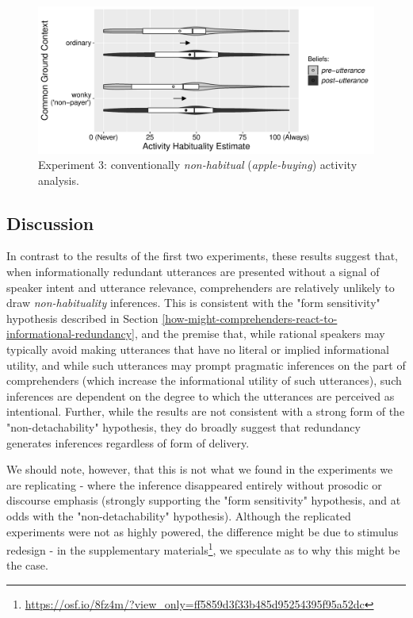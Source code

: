 \documentclass{sp}\usepackage[]{graphicx}\usepackage[]{color}
\makeatletter
\def\maxwidth{ %
  \ifdim\Gin@nat@width>\linewidth
    \linewidth
  \else
    \Gin@nat@width
  \fi
}
\newenvironment{knitrout}{}{} %
\makeatother
\begin{document}
\begin{knitrout}
\color{fgcolor}\begin{figure}
\includegraphics[width=\maxwidth]{figure/unnamed-chunk-61-1} \caption{\label{fig:exp3nonhabitual}Experiment 3: conventionally \textit{non-habitual} (\textit{apple-buying}) activity analysis.}\label{fig:unnamed-chunk-61}
\end{figure}


\end{knitrout}

\subsection{Discussion}

In contrast to the results of the first two experiments, these results suggest that, when informationally redundant utterances are presented without a signal of speaker intent and utterance relevance, comprehenders are relatively unlikely to draw \textit{non-habituality} inferences. This is consistent with the "form sensitivity" hypothesis described in Section \ref{how-might-comprehenders-react-to-informational-redundancy}, and the premise that, while rational speakers may typically avoid making utterances that have no literal or implied informational utility, and while such utterances may prompt pragmatic inferences on the part of comprehenders (which increase the informational utility of such utterances), such inferences are dependent on the degree to which the utterances are perceived as intentional.  Further, while the results are not consistent with a strong form of the "non-detachability" hypothesis, they do broadly suggest that redundancy generates inferences regardless of form of delivery.

We should note, however, that this is not what we found in the experiments we are replicating - where the inference disappeared entirely without prosodic or discourse emphasis (strongly supporting the "form sensitivity" hypothesis, and at odds with the "non-detachability" hypothesis).  Although the replicated experiments were not as highly powered, the difference might be due to stimulus redesign - in the supplementary materials\footnote{\url{https://osf.io/8fz4m/?view_only=ff5859d3f33b485d95254395f95a52dc}}, we speculate as to why this might be the case.
\end{document}
